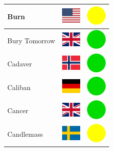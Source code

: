 \documentclass[12pt, a4paper, twoside]{report}
\begin{document}
\begin{center}
\begin{longtable}{|p{5cm}|p{2cm}|p{2cm}|}
			Burn & \includegraphics[width=1cm]{4x3/us} & \includegraphics[width=1cm]{likes/m} \\ \hline
			Bury Tomorrow & \includegraphics[width=1cm]{4x3/gb} & \includegraphics[width=1cm]{likes/y} \\ \hline
			Cadaver & \includegraphics[width=1cm]{4x3/no} & \includegraphics[width=1cm]{likes/y} \\ \hline
			Caliban & \includegraphics[width=1cm]{4x3/de} & \includegraphics[width=1cm]{likes/y} \\ \hline
			Cancer & \includegraphics[width=1cm]{4x3/gb} & \includegraphics[width=1cm]{likes/y} \\ \hline
			Candlemass & \includegraphics[width=1cm]{4x3/se} & \includegraphics[width=1cm]{likes/m} \\ \hline

\end{longtable}
\end{center}
\end{document}
